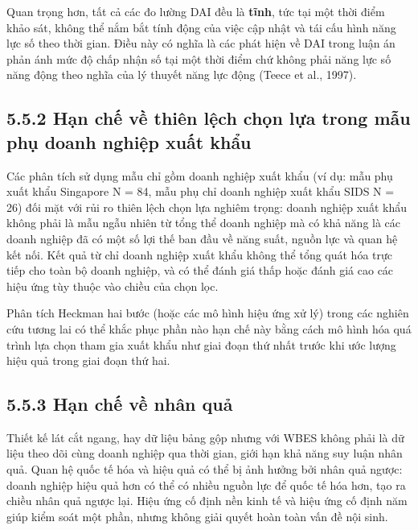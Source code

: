 \documentclass[
  a4paper,
  13pt]{extreport}
\begin{document}
Quan trọng hơn, tất cả các đo lường DAI đều là \textbf{tĩnh}, tức tại
một thời điểm khảo sát, không thể nắm bắt tính động của việc cập nhật và
tái cấu hình năng lực số theo thời gian. Điều này có nghĩa là các phát
hiện về DAI trong luận án phản ánh mức độ chấp nhận số tại một thời điểm
chứ không phải năng lực số năng động theo nghĩa của lý thuyết năng lực
động (Teece et al., 1997).

\hypertarget{hux1ea1n-chux1ebf-vux1ec1-thiuxean-lux1ec7ch-chux1ecdn-lux1ef1a-trong-mux1eabu-phux1ee5-doanh-nghiux1ec7p-xuux1ea5t-khux1ea9u}{%
\subsection{5.5.2 Hạn chế về thiên lệch chọn lựa trong mẫu phụ doanh
nghiệp xuất
khẩu}\label{hux1ea1n-chux1ebf-vux1ec1-thiuxean-lux1ec7ch-chux1ecdn-lux1ef1a-trong-mux1eabu-phux1ee5-doanh-nghiux1ec7p-xuux1ea5t-khux1ea9u}}

Các phân tích sử dụng mẫu chỉ gồm doanh nghiệp xuất khẩu (ví dụ: mẫu phụ
xuất khẩu Singapore N = 84, mẫu phụ chỉ doanh nghiệp xuất khẩu SIDS N =
26) đối mặt với rủi ro thiên lệch chọn lựa nghiêm trọng: doanh nghiệp
xuất khẩu không phải là mẫu ngẫu nhiên từ tổng thể doanh nghiệp mà có
khả năng là các doanh nghiệp đã có một số lợi thế ban đầu về năng suất,
nguồn lực và quan hệ kết nối. Kết quả từ chỉ doanh nghiệp xuất khẩu
không thể tổng quát hóa trực tiếp cho toàn bộ doanh nghiệp, và có thể
đánh giá thấp hoặc đánh giá cao các hiệu ứng tùy thuộc vào chiều của
chọn lọc.

Phân tích Heckman hai bước (hoặc các mô hình hiệu ứng xử lý) trong các
nghiên cứu tương lai có thể khắc phục phần nào hạn chế này bằng cách mô
hình hóa quá trình lựa chọn tham gia xuất khẩu như giai đoạn thứ nhất
trước khi ước lượng hiệu quả trong giai đoạn thứ hai.

\hypertarget{hux1ea1n-chux1ebf-vux1ec1-nhuxe2n-quux1ea3}{%
\subsection{5.5.3 Hạn chế về nhân
quả}\label{hux1ea1n-chux1ebf-vux1ec1-nhuxe2n-quux1ea3}}

Thiết kế lát cắt ngang, hay dữ liệu bảng gộp nhưng với WBES không phải
là dữ liệu theo dõi cùng doanh nghiệp qua thời gian, giới hạn khả năng
suy luận nhân quả. Quan hệ quốc tế hóa và hiệu quả có thể bị ảnh hưởng
bởi nhân quả ngược: doanh nghiệp hiệu quả hơn có thể có nhiều nguồn lực
để quốc tế hóa hơn, tạo ra chiều nhân quả ngược lại. Hiệu ứng cố định
nền kinh tế và hiệu ứng cố định năm giúp kiểm soát một phần, nhưng không
giải quyết hoàn toàn vấn đề nội sinh.
\end{document}
